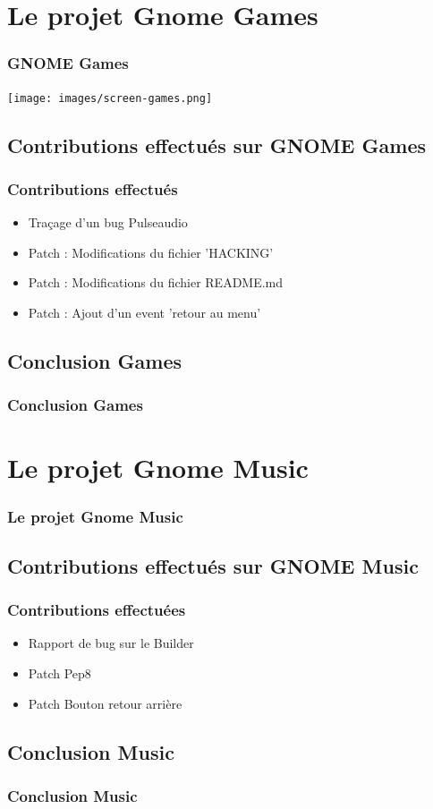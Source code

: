 \documentclass{beamer}
\begin{document}
\section{Le projet Gnome Games}
\begin{frame}
  \frametitle{GNOME Games}
  \texttt{[image: images/screen-games.png]}
\end{frame}

\subsection{Contributions effectués sur GNOME Games}
\begin{frame}
  \frametitle{Contributions effectués}
  \begin{itemize}
    \item Traçage d'un bug Pulseaudio
    \item Patch : Modifications du fichier 'HACKING'
    \item Patch : Modifications du fichier README.md
    \item Patch : Ajout d'un event 'retour au menu'
  \end{itemize}
\end{frame}

\subsection{Conclusion Games}
\begin{frame}
  \frametitle{Conclusion Games}
\end{frame}

\section{Le projet Gnome Music}
\begin{frame}
  \frametitle{Le projet Gnome Music}
\end{frame}

\subsection{Contributions effectués sur GNOME Music}
\begin{frame}
  \frametitle{Contributions effectuées}
  \begin{itemize}
  \item Rapport de bug sur le Builder
  \item Patch Pep8
  \item Patch Bouton retour arrière
  \end{itemize}
\end{frame}

\subsection{Conclusion Music}
\begin{frame}
  \frametitle{Conclusion Music}
\end{frame}
\end{document}
